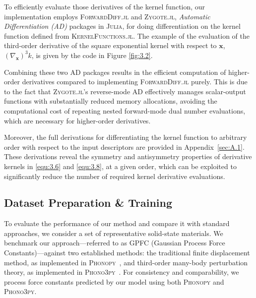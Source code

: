 To efficiently evaluate those derivatives of the kernel function, our implementation employs \textsc{ForwardDiff.jl} and \textsc{Zygote.jl}, \textit{Automatic Differentiation (AD)} packages in \textsc{Julia}, for doing differentiation on the kernel function defined from \textsc{KernelFunctions.jl}.
The example of the evaluation of the third-order derivative of the square exponential kernel with respect to $\mathbf{x}$, $(\nabla_{\mathbf{x}})^{3}k$, is given by the code in Figure \ref{fig:3.2}.

Combining these two AD packages results in the efficient computation of higher-order derivatives compared to implementing \textsc{ForwardDiff.jl} purely. 
This is due to the fact that \textsc{Zygote.jl}'s reverse-mode AD effectively manages scalar-output functions with substantially reduced memory allocations, avoiding the computational cost of repeating nested forward-mode dual number evaluations, which are necessary for higher-order derivatives.

Moreover, the full derivations for differentiating the kernel function to arbitrary order with respect to the input descriptors are provided in Appendix~\ref{sec:A.1}. These derivations reveal the symmetry and antisymmetry properties of derivative kernels in \eqref{equ:3.6} and \eqref{equ:3.8}, at a given order, which can be exploited to significantly reduce the number of required kernel derivative evaluations.


\subsection{Dataset Preparation \& Training} \label{subsec:3.1.2}

To evaluate the performance of our method and compare it with standard approaches, we consider a set of representative solid-state materials. We benchmark our approach—referred to as GPFC (Gaussian Process Force Constants)—against two established methods: the traditional finite displacement method, as implemented in \textsc{Phonopy}~\cite{phonopy,Phonopy_toolkit}, and third-order many-body perturbation theory, as implemented in \textsc{Phono3py}~\cite{Togo2015-qf,Phonopy_toolkit}. For consistency and comparability, we process force constants predicted by our model using both \textsc{Phonopy} and \textsc{Phono3py}.
